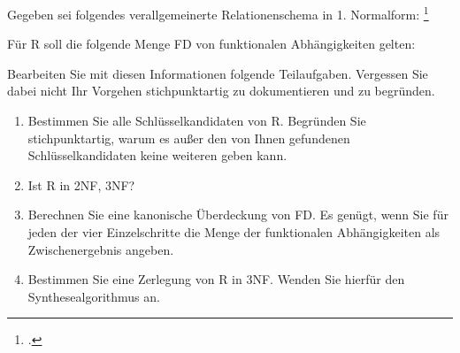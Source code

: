 \documentclass{bschlangaul-aufgabe}
\begin{document}

Gegeben sei folgendes verallgemeinerte Relationenschema in 1. Normalform:
\footcite{examen:66116:2015:09}

\begin{center}
\end{center}

Für R soll die folgende Menge FD von funktionalen Abhängigkeiten gelten:


Bearbeiten Sie mit diesen Informationen folgende Teilaufgaben. Vergessen
Sie dabei nicht Ihr Vorgehen stichpunktartig zu dokumentieren und zu
begründen.

\begin{enumerate}


\item Bestimmen Sie alle Schlüsselkandidaten von R. Begründen Sie
stichpunktartig, warum es außer den von Ihnen gefundenen
Schlüsselkandidaten keine weiteren geben kann.


\item Ist R in 2NF, 3NF?


\item Berechnen Sie eine kanonische Überdeckung von FD. Es genügt, wenn
Sie für jeden der vier Einzelschritte die Menge der funktionalen
Abhängigkeiten als Zwischenergebnis angeben.


\item Bestimmen Sie eine Zerlegung von R in 3NF. Wenden Sie hierfür den
Synthesealgorithmus an.

\end{enumerate}
\end{document}
